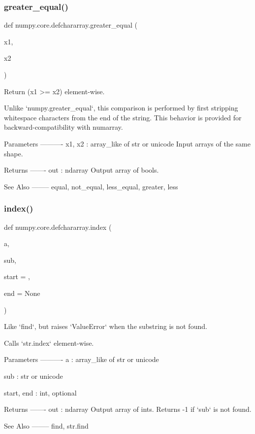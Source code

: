 \subsubsection{\texorpdfstring{greater\+\_\+equal()}{greater\_equal()}}
{\footnotesize\ttfamily def numpy.\+core.\+defchararray.\+greater\+\_\+equal (\begin{DoxyParamCaption}\item[{}]{x1,  }\item[{}]{x2 }\end{DoxyParamCaption})}

\begin{DoxyVerb}Return (x1 >= x2) element-wise.

Unlike `numpy.greater_equal`, this comparison is performed by
first stripping whitespace characters from the end of the string.
This behavior is provided for backward-compatibility with
numarray.

Parameters
----------
x1, x2 : array_like of str or unicode
    Input arrays of the same shape.

Returns
-------
out : ndarray
    Output array of bools.

See Also
--------
equal, not_equal, less_equal, greater, less
\end{DoxyVerb}
 \mbox{\label{namespacenumpy_1_1core_1_1defchararray_a2472210b68b9a54ef106cf588af14748}} 
\subsubsection{\texorpdfstring{index()}{index()}}
{\footnotesize\ttfamily def numpy.\+core.\+defchararray.\+index (\begin{DoxyParamCaption}\item[{}]{a,  }\item[{}]{sub,  }\item[{}]{start = {},  }\item[{}]{end = {\ttfamily None} }\end{DoxyParamCaption})}

\begin{DoxyVerb}Like `find`, but raises `ValueError` when the substring is not found.

Calls `str.index` element-wise.

Parameters
----------
a : array_like of str or unicode

sub : str or unicode

start, end : int, optional

Returns
-------
out : ndarray
    Output array of ints.  Returns -1 if `sub` is not found.

See Also
--------
find, str.find\end{DoxyVerb}
 \mbox{\label{namespacenumpy_1_1core_1_1defchararray_a84e96a6787251358996f8635bdcd1664}} 

